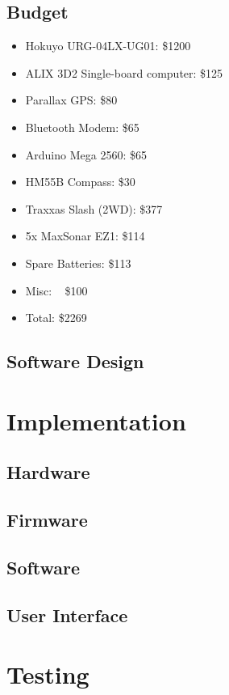 \documentclass[a4paper,12pt]{article}
\begin{document}
\subsection{Budget}
\begin{itemize}
\item Hokuyo URG-04LX-UG01: \$1200
\item ALIX 3D2 Single-board computer: \$125
\item Parallax GPS: \$80
\item Bluetooth Modem: \$65
\item Arduino Mega 2560: \$65
\item HM55B Compass: \$30
\item Traxxas Slash (2WD): \$377
\item 5x MaxSonar EZ1: \$114
\item Spare Batteries: \$113
\item Misc: ~ \$100
\item Total: \$2269
\end{itemize}

\subsection{Software Design}


\section{Implementation}
\subsection{Hardware}


\subsection{Firmware}


\subsection{Software}


\subsection{User Interface}


\section{Testing}

\end{document}
